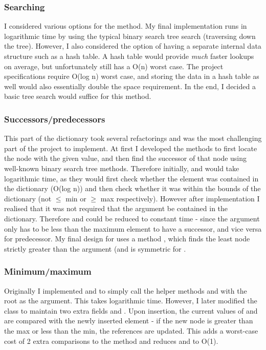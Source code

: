 \subsubsection{Searching}
I considered various options for the  method. My final implementation runs in logarithmic time by using the typical binary search tree search (traversing down the tree). However, I also considered the option of having a separate internal data structure such as a hash table. A hash table would provide \textit{much} faster lookups on average, but unfortunately still has a O(n) worst case. The project specifications require O(log n) worst case, and storing the data in a hash table as well would also essentially double the space requirement. In the end, I decided a basic tree search would suffice for this method.
 
\subsubsection{Successors/predecessors}
This part of the dictionary took several refactorings and was the most challenging part of the project to implement. At first I developed the methods to first locate the node with the given value, and then find the successor of that node using well-known binary search tree methods. Therefore initially,  and  would take logarithmic time, as they would first check whether the element was contained in the dictionary (O(log n)) and then check whether it was within the bounds of the dictionary (not $\leq$ min or $\geq$ max respectively). However after implementation I realised that it was not required that the argument be contained in the dictionary. Therefore  and  could be reduced to constant time - since the argument only has to be less than the maximum element to have a successor, and vice versa for predecessor. My final design for  uses a method , which finds the least node strictly greater than the argument (and  is symmetric for .

\subsubsection{Minimum/maximum}
Originally I implemented  and  to simply call the helper methods  and  with the root as the argument. This takes logarithmic time. However, I later modified the class to maintain two extra fields  and . Upon insertion, the current values of  and  are compared with the newly inserted element - if the new node is greater than the max or less than the min, the references are updated. This adds a worst-case cost of 2  extra comparisons to the  method and reduces  and  to O(1).

